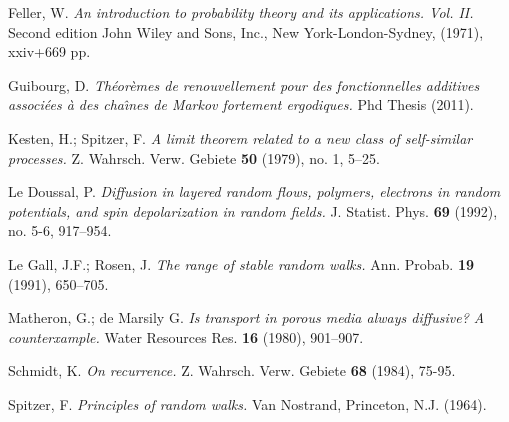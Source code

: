 \documentclass[oneside, a4paper,11pt,reqno]{amsart}
\begin{document}
\begin{thebibliography}{00}
 Feller, W. {\em An introduction to probability theory and its applications. Vol. II.} Second edition John Wiley and Sons, Inc., New York-London-Sydney, (1971), xxiv+669 pp.

 

 Guibourg, D. {\em Th\'eor\`emes de renouvellement pour des fonctionnelles additives associ\'ees \`a des cha\^{\i}nes de Markov fortement ergodiques.} Phd Thesis (2011).

 Kesten, H.; Spitzer, F. 
{\em  A limit theorem related to a new class of self-similar processes.} 
Z. Wahrsch. Verw. Gebiete {\bf 50} (1979), no. 1, 5--25.  

 Le Doussal, P. {\em  Diffusion in layered random flows, polymers, electrons 
in random potentials, and spin depolarization in random fields.}
  J. Statist. Phys.  {\bf 69}  (1992),  no. 5-6, 917--954.

 Le Gall, J.F.; Rosen, J. {\em The range of stable random walks.} Ann. Probab. {\bf 19} (1991), 650--705.

 Matheron, G.; de Marsily G.
{\em Is transport in porous media always diffusive? A counterxample.}
Water Resources Res. {\bf 16} (1980), 901--907. 

 Schmidt, K. {\em On recurrence.} Z. Wahrsch. Verw. Gebiete
{\bf 68} (1984), 75-95.

 Spitzer, F. {\em Principles of random walks.}
Van Nostrand, Princeton, N.J. (1964).

\end{thebibliography} 
\end{document}

